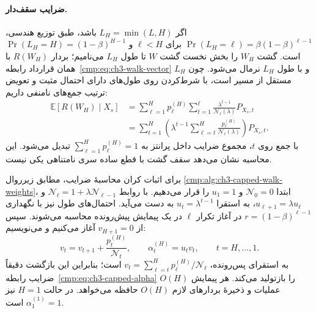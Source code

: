 \paragraph{ضرایب سقف‌دار.}
اگر $L_H=\min(L,H)$ باشد، طبق توزیع هندسی،
$\Pr(L_H=\ell)=\beta(1-\beta)^{\ell-1}$ برای $\ell<H$ و
$\Pr(L_H=H)=(1-\beta)^{H-1}$ است.
گشت $W_H$ را بخش نخست گشت $W$ تا طول $L_H$
می‌نامیم؛ بردار $R(W_H)$ با همان قرارداد
رابطه~\eqref{cmp:eq:ch3-walk-vector} و با طول $L_H$
نرمال می‌شود. چون $L_H$ مستقل از مسیر است،
با شرط‌کردن روی طول‌های دارای احتمال مثبت و تعویض
ترتیب جمع‌های نامنفی داریم:
\begin{equation}\label{eq:app-ch3-capped-alpha-proof}
\begin{aligned}
\mathbb E[R(W_H)\mid X_s]
&=\sum_{\ell=1}^{H}p_\ell^{(H)}
\sum_{t=1}^{\ell}
\frac{\lambda^{t-1}}{\mathcal N_\ell(\lambda)}P_{X_s,t}\\
&=\sum_{t=1}^{H}\left(
\lambda^{t-1}\sum_{\ell=t}^{H}
\frac{p_\ell^{(H)}}{\mathcal N_\ell(\lambda)}\right)P_{X_s,t}.
\end{aligned}
\end{equation}
با جمع روی $t$، مجموع ضرایب داخل پرانتز به
$\sum_{\ell=1}^{H}p_\ell^{(H)}=1$ تبدیل می‌شود. این محاسبه نشان می‌دهد سقف گشت با قطع ساده سری نامتناهی یکی نیست.

برای اثبات کران محاسبهٔ ضرایب، مطابق زیرروال
\ref{cmp:alg:ch3-capped-walk-weights}،
ابتدا $\mathcal N_0=0$ و $u_1=1$ را قرار می‌دهیم.
با روابط $\mathcal N_\ell=1+\lambda\mathcal N_{\ell-1}$
و $u_{\ell+1}=\lambda u_\ell$،
به استقرا $u_t=\lambda^{t-1}$ به دست می‌آید.
احتمال‌های طول نیز با نگهداری
$r=(1-\beta)^{\ell-1}$ در آغاز تکرار $\ell$
در یک پیمایش پیش‌رونده محاسبه می‌شوند.
سپس از $v_{H+1}=0$ آغاز می‌کنیم و می‌نویسیم:
\begin{equation}\label{eq:app-ch3-capped-weight-recursion}
v_t=v_{t+1}+\frac{p_t^{(H)}}{\mathcal N_t},
\qquad
\alpha_t^{(H)}=u_tv_t,\qquad t=H,\ldots,1.
\end{equation}
به استقرای پس‌رونده،
$v_t=\sum_{\ell=t}^H p_\ell^{(H)}/\mathcal N_\ell$
است؛ بنابراین این بازگشت دقیقاً ضرایب
رابطه~\eqref{cmp:eq:ch3-capped-alpha} را بازتولید
می‌کند. هر پیمایش $O(H)$ عملیات و ذخیرهٔ
بردارهای لازم $O(H)$ حافظه می‌خواهد.
در حالت $H=1$ نیز $\alpha_1^{(1)}=1$ است.

